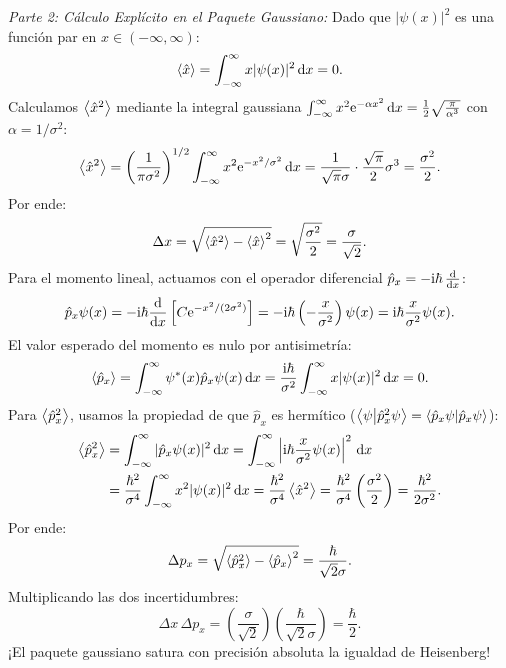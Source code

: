 \begin{ejemplobox}
    \textit{Parte 2: Cálculo Explícito en el Paquete Gaussiano:}
    Dado que $|\psi(x)|^2$ es una función par en $x \in (-\infty, \infty)$:
    \begin{equation}
        \left\langle \hat{x} \right\rangle = \int_{-\infty}^\infty x |\psi(x)|^2\,\mathrm{d} x = 0.
    \end{equation}
    Calculamos $\left\langle \hat{x}^2 \right\rangle$ mediante la integral gaussiana $\int_{-\infty}^\infty x^2 \mathrm{e}^{-\alpha x^2}\,\mathrm{d} x = \frac{1}{2}\sqrt{\frac{\pi}{\alpha^3}}$ con $\alpha = 1/\sigma^2$:
    \begin{equation}
        \left\langle \hat{x}^2 \right\rangle = \left(\frac{1}{\pi\sigma^2}\right)^{1/2} \int_{-\infty}^\infty x^2 \mathrm{e}^{-x^2/\sigma^2}\,\mathrm{d} x = \frac{1}{\sqrt{\pi}\sigma} \cdot \frac{\sqrt{\pi}}{2}\sigma^3 = \frac{\sigma^2}{2}.
    \end{equation}
    Por ende:
    \begin{equation}
        \Delta x = \sqrt{\left\langle \hat{x}^2 \right\rangle - \left\langle \hat{x} \right\rangle^2} = \sqrt{\frac{\sigma^2}{2}} = \frac{\sigma}{\sqrt{2}}.
    \end{equation}
    Para el momento lineal, actuamos con el operador diferencial $\hat{p}_x = -\mathrm{i}\hbar\,\frac{\mathrm{d}}{\mathrm{d} x}$:
    \begin{equation}
        \hat{p}_x \psi(x) = -\mathrm{i}\hbar \frac{\mathrm{d}}{\mathrm{d} x}\left[ C \mathrm{e}^{-x^2/(2\sigma^2)} \right] = -\mathrm{i}\hbar \left(-\frac{x}{\sigma^2}\right)\psi(x) = \mathrm{i}\hbar\frac{x}{\sigma^2}\psi(x).
    \end{equation}
    El valor esperado del momento es nulo por antisimetría:
    \begin{equation}
        \left\langle \hat{p}_x \right\rangle = \int_{-\infty}^\infty \psi^*(x)\hat{p}_x\psi(x)\,\mathrm{d} x = \frac{\mathrm{i}\hbar}{\sigma^2}\int_{-\infty}^\infty x |\psi(x)|^2\,\mathrm{d} x = 0.
    \end{equation}
    Para $\left\langle \hat{p}_x^2 \right\rangle$, usamos la propiedad de que $\hat{p}_x$ es hermítico ($\left\langle \psi \middle| \hat{p}_x^2\psi \right\rangle = \left\langle \hat{p}_x\psi \middle| \hat{p}_x\psi \right\rangle$):
    \begin{align}
        \left\langle \hat{p}_x^2 \right\rangle &= \int_{-\infty}^\infty |\hat{p}_x\psi(x)|^2\,\mathrm{d} x = \int_{-\infty}^\infty \left|\mathrm{i}\hbar\frac{x}{\sigma^2}\psi(x)\right|^2\,\mathrm{d} x \nonumber\\
        &= \frac{\hbar^2}{\sigma^4}\int_{-\infty}^\infty x^2 |\psi(x)|^2\,\mathrm{d} x = \frac{\hbar^2}{\sigma^4}\left\langle \hat{x}^2 \right\rangle = \frac{\hbar^2}{\sigma^4}\left(\frac{\sigma^2}{2}\right) = \frac{\hbar^2}{2\sigma^2}.
    \end{align}
    Por ende:
    \begin{equation}
        \Delta p_x = \sqrt{\left\langle \hat{p}_x^2 \right\rangle - \left\langle \hat{p}_x \right\rangle^2} = \frac{\hbar}{\sqrt{2}\sigma}.
    \end{equation}
    Multiplicando las dos incertidumbres:
    \begin{equation}
        \Delta x \, \Delta p_x = \left(\frac{\sigma}{\sqrt{2}}\right)\left(\frac{\hbar}{\sqrt{2}\sigma}\right) = \frac{\hbar}{2}.
    \end{equation}
    ¡El paquete gaussiano satura con precisión absoluta la igualdad de Heisenberg!


\end{ejemplobox}
